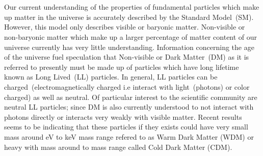 \paragraph*{} \mbox{}\\
Our current understanding of the properties of fundamental particles which make up matter in the universe is accurately described by the Standard Model~(SM). However, this model only describes visible or baryonic matter. Non-visible or non-baryonic matter which make up a larger percentage of matter content of our universe currently has very little understanding.  Information concerning the age of the universe fuel speculation that Non-visible or Dark Matter~(DM) as it is referred to presently must be made up of particles which have long lifetime known as Long Lived~(LL) particles.  In general, LL particles can be charged~(electromagnetically charged i.e interact with light~(photons) or color charged) as well as neutral.
\newline
Of particular interest to the scientific community are neutral LL particles; since DM is also currently understood to not interact with photons  directly or interacts very weakly with visible matter.  Recent results seems to be indicating that these particles  if they exists could have very small mass around eV to keV mass range refered to as Warm Dark Matter (WDM) or heavy with mass around \GeV to \TeV mass range called Cold Dark Matter (CDM).
